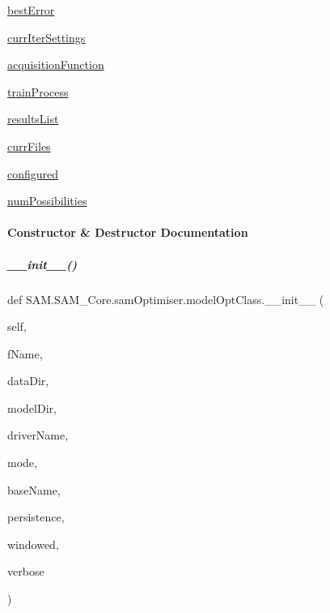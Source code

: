 \begin{DoxyCompactItemize}
\item 
\hyperlink{group__icubclient__SAM__Core_a0944faf9d94abaae6c276e972d9cafc8}{best\+Error}
\item 
\hyperlink{group__icubclient__SAM__Core_a037105d9d4248120cd22f1303c725f3b}{curr\+Iter\+Settings}
\item 
\hyperlink{group__icubclient__SAM__Core_a78f7ff7f83510d8b5044dc915d38cee4}{acquisition\+Function}
\item 
\hyperlink{group__icubclient__SAM__Core_a4cd677f2ebd8cd5001d26e02b608714c}{train\+Process}
\item 
\hyperlink{group__icubclient__SAM__Core_a94714fc23f88b87b8c774b1af3288042}{results\+List}
\item 
\hyperlink{group__icubclient__SAM__Core_a164aa08a30d7aab305eb2a153033fdff}{curr\+Files}
\item 
\hyperlink{group__icubclient__SAM__Core_a7f73bedb1900c877af3a434ecf86767f}{configured}
\item 
\hyperlink{group__icubclient__SAM__Core_a4875a33b20e97c640a4ecc8c355927dc}{num\+Possibilities}
\end{DoxyCompactItemize}


\paragraph{Constructor \& Destructor Documentation}
\mbox{\label{group__icubclient__SAM__Core_a77bce579095af6c3bdf0addf92826bcf}} 
\subparagraph{\texorpdfstring{\+\_\+\+\_\+init\+\_\+\+\_\+()}{\_\_init\_\_()}}
{\footnotesize\ttfamily def S\+A\+M.\+S\+A\+M\+\_\+\+Core.\+sam\+Optimiser.\+model\+Opt\+Class.\+\_\+\+\_\+init\+\_\+\+\_\+ (\begin{DoxyParamCaption}\item[{}]{self,  }\item[{}]{f\+Name,  }\item[{}]{data\+Dir,  }\item[{}]{model\+Dir,  }\item[{}]{driver\+Name,  }\item[{}]{mode,  }\item[{}]{base\+Name,  }\item[{}]{persistence,  }\item[{}]{windowed,  }\item[{}]{verbose }\end{DoxyParamCaption})}



